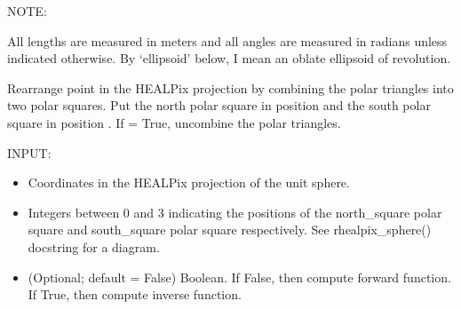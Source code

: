 \documentclass[a4paper,12ptopenany,oneside,english]{sphinxmanual}
\begin{document}
\sphinxAtStartPar
NOTE:

\sphinxAtStartPar
All lengths are measured in meters and all angles are measured in radians
unless indicated otherwise.
By ‘ellipsoid’ below, I mean an oblate ellipsoid of revolution.

\begin{fulllineitems}
\label{\detokenize{pj_rhealpix:rhealpixdggs.pj_rhealpix.combine_triangles}}
\pysigstartsignatures
{}
\pysigstopsignatures
\sphinxAtStartPar
Rearrange point  in the HEALPix projection by
combining the polar triangles into two polar squares.
Put the north polar square in position  and
the south polar square in position .
If  = True, uncombine the polar triangles.

\sphinxAtStartPar
INPUT:
\begin{itemize}
\item {} 
\sphinxAtStartPar
{} \sphinxhyphen{} Coordinates in the HEALPix projection of the unit sphere.

\item {} 
\sphinxAtStartPar
{} \sphinxhyphen{} Integers between 0 and 3 indicating
the positions of the north\_square polar square and south\_square polar
square respectively.
See rhealpix\_sphere() docstring for a diagram.

\item {} 
\sphinxAtStartPar
{} \sphinxhyphen{} (Optional; default = False) Boolean. If False, then compute
forward function. If True, then compute inverse function.


\end{itemize}
\end{fulllineitems}
\end{document}
